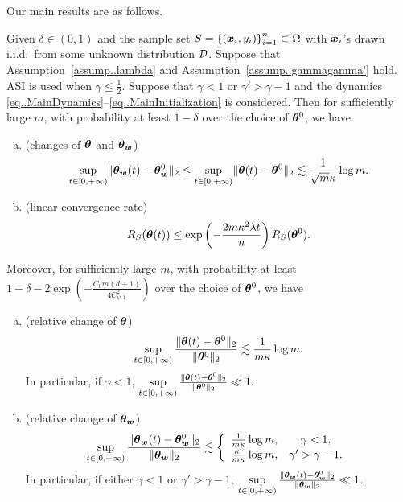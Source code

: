 \documentclass{article}
\begin{document}
Our main results are as follows.
\begin{thm}\label{thm..LinearRegime}
    Given $\delta\in(0,1)$ and the sample set $S = {\{(\bm{x}_i, y_i)\}}_{i=1}^n\subset\Omega$ with $\bm{x}_i$'s drawn i.i.d.\ from some unknown distribution $\mathcal{D}$. Suppose that Assumption~\ref{assump..lambda} and Assumption~\ref{assump..gammagamma'} hold. ASI is used when $\gamma\leq\frac{1}{2}$. Suppose that $\gamma<1$ or $\gamma'>\gamma-1$ and the dynamics \eqref{eq..MainDynamics}--\eqref{eq..MainInitialization} is considered. Then for sufficiently large $m$, with probability at least $1-\delta$ over the choice of $\bm{\theta}^0$, we have
    \begin{enumerate}[(a)]
        \item (changes of $\bm{\theta}$ and $\bm{\theta}_{\bm{w}}$)
        \begin{equation}
            \sup\limits_{t\in[0,+\infty)}\lVert\bm{\theta}_{\bm{w}}(t)-\bm{\theta}_{\bm{w}}^0\rVert_2\leq \sup\limits_{t\in[0,+\infty)}\lVert\bm{\theta}(t)-\bm{\theta}^0\rVert_2\lesssim\frac{1}{\sqrt{m}\kappa}\log m.
        \end{equation}
        \item (linear convergence rate) 
        \begin{equation}
            R_S(\bm{\theta}(t))\leq \exp\left(-\frac{2m\kappa^2\lambda t}{n}\right)R_S(\bm{\theta}^0).
        \end{equation}
    \end{enumerate}
        Moreover, for sufficiently large $m$, with probability at least $1-\delta-2\exp\left(-\frac{C_0m(d+1)}{4C^2_{\psi,1}}\right)$ over the choice of $\bm{\theta}^0$, we have
    \begin{enumerate}[(c)]
        \item (relative change of $\bm{\theta}$)
        \begin{equation}
            \sup\limits_{t\in[0,+\infty)}\frac{\lVert\bm{\theta}(t)-\bm{\theta}^0\rVert_2}{\lVert\bm{\theta}^0\rVert_2}\lesssim\frac{1}{m\kappa}\log m.
        \end{equation} 
        In particular, if $\gamma<1$, $\sup\limits_{t\in[0,+\infty)}\frac{\lVert\bm{\theta}(t)-\bm{\theta}^0\rVert_2}{\lVert\bm{\theta}^0\rVert_2}\ll 1.$
        \item (relative change of $\bm{\theta}_{\bm{w}}$)
        \begin{equation}
            \sup\limits_{t\in[0,+\infty)}\frac{\lVert\bm{\theta}_{\bm{w}}(t)-\bm{\theta}_{\bm{w}}^0\rVert_2}{\lVert\bm{\theta}_{\bm{w}}\rVert_2}
            \lesssim
            \left\{
            \begin{array}{cc}
               \frac{1}{m\kappa}\log m, &  \gamma<1,\\
               \frac{\kappa'}{m\kappa}\log m, & \gamma'>\gamma-1.
            \end{array}\right.
        \end{equation}
        In particular, if either $\gamma<1$ or $\gamma'>\gamma-1$, $\sup\limits_{t\in[0,+\infty)}\frac{\lVert\bm{\theta}_{\bm{w}}(t)-\bm{\theta}_{\bm{w}}^0\rVert_2}{\lVert\bm{\theta}_{\bm{w}}\rVert_2}\ll1$.
    \end{enumerate}
\end{thm}
\end{document}
